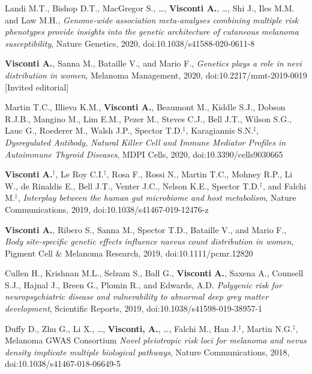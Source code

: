 \documentclass[a4paper,10pt]{article}
\begin{document}
{\begin{itemize}
		 Landi M.T., Bishop D.T., MacGregor S., \dots, \textbf{Visconti A.}, \dots, Shi J., Iles M.M. and Law M.H., \emph{Genome-wide association meta-analyses combining multiple risk phenotypes provide insights into the genetic architecture of cutaneous melanoma susceptibility}, Nature Genetics, 2020, doi:10.1038/s41588-020-0611-8

		 \textbf{Visconti A.}, Sanna M., Bataille V., and Mario F., \emph{Genetics plays a role in nevi distribution in women}, Melanoma Management, 2020, doi:10.2217/mmt-2019-0019 [Invited editorial]

		 Martin T.C., Illieva K.M., \textbf{Visconti A.}, Beaumont M., Kiddle S.J., Dobson R.J.B., Mangino M., Lim E.M., Pezer M., Steves C.J., Bell J.T., Wilson S.G., Lauc G., Roederer M., Walsh J.P., Spector T.D.$^{\textbf{$\ddag $}}$, Karagiannis S.N.$^{\textbf{$\ddag $}}$, \emph{Dysregulated Antibody, Natural Killer Cell and Immune Mediator Profiles in Autoimmune Thyroid Diseases}, MDPI Cells, 2020, doi:10.3390/cells9030665
		
		 \textbf{Visconti A.}$^{\textbf{$\dag $}}$, Le Roy C.I.$^{\textbf{$\dag $}}$, Rosa F., Rossi N., Martin T.C., Mohney R.P., Li W., de Rinaldis E., Bell J.T., Venter J.C., Nelson K.E., Spector T.D.$^{\textbf{$\ddag $}}$, and Falchi M.$^{\textbf{$\ddag $}}$, \emph{Interplay between the human gut microbiome and host metabolism}, Nature Communications, 2019, doi:10.1038/s41467-019-12476-z

		 \textbf{Visconti A.}, Ribero S., Sanna M., Spector T.D., Bataille V., and Mario F., \emph{Body site-specific genetic effects influence naevus count distribution in women}, Pigment Cell \& Melanoma Research, 2019, doi:10.1111/pcmr.12820
		
		 Cullen H., Krishnan M.L., Selzam S., Ball G., \textbf{Visconti A.}, Saxena A., Counsell S.J., Hajnal J., Breen G., Plomin R., and Edwards, A.D. \emph{Polygenic risk for neuropsychiatric disease and vulnerability to abnormal deep grey matter development}, Scientific Reports, 2019, doi:10.1038/s41598-019-38957-1
		
		 Duffy D., Zhu G., Li X., \dots, \textbf{Visconti, A.}, \dots, Falchi M., Han J.$^{\textbf{$\ddag $}}$, Martin N.G.$^{\textbf{$\ddag $}}$, Melanoma GWAS Consortium \emph{Novel pleiotropic risk loci for melanoma and nevus density implicate multiple biological pathways}, Nature Communications, 2018, doi:10.1038/s41467-018-06649-5
		

\end{itemize}}
\end{document}
